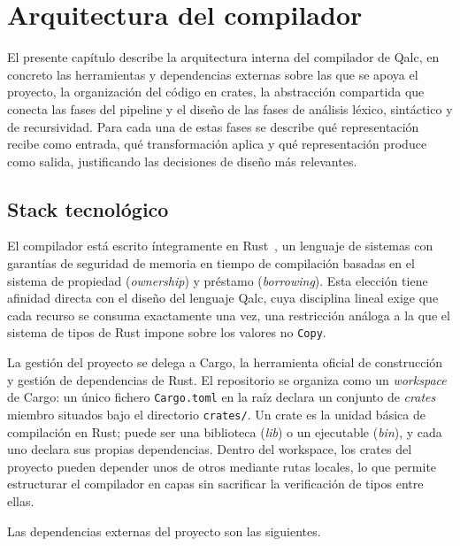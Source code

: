 \chapter{Arquitectura del compilador}
\label{ch:arquitectura}

El presente capítulo describe la arquitectura interna del compilador de Qalc, en concreto las herramientas y dependencias externas sobre las que se apoya el proyecto, la organización del código en crates, la abstracción compartida que conecta las fases del pipeline y el diseño de las fases de análisis léxico, sintáctico y de recursividad. Para cada una de estas fases se describe qué representación recibe como entrada, qué transformación aplica y qué representación produce como salida, justificando las decisiones de diseño más relevantes.

\section{Stack tecnológico}
\label{sec:stack}

El compilador está escrito íntegramente en Rust~\cite{matsakis_rust_2014}, un lenguaje de sistemas con garantías de seguridad de memoria en tiempo de compilación basadas en el sistema de propiedad (\textit{ownership}) y préstamo (\textit{borrowing}). Esta elección tiene afinidad directa con el diseño del lenguaje Qalc, cuya disciplina lineal exige que cada recurso se consuma exactamente una vez, una restricción análoga a la que el sistema de tipos de Rust impone sobre los valores no \lstinline|Copy|.

La gestión del proyecto se delega a Cargo, la herramienta oficial de construcción y gestión de dependencias de Rust. El repositorio se organiza como un \textit{workspace} de Cargo: un único fichero \lstinline|Cargo.toml| en la raíz declara un conjunto de \textit{crates} miembro situados bajo el directorio \lstinline|crates/|. Un crate es la unidad básica de compilación en Rust; puede ser una biblioteca (\textit{lib}) o un ejecutable (\textit{bin}), y cada uno declara sus propias dependencias. Dentro del workspace, los crates del proyecto pueden depender unos de otros mediante rutas locales, lo que permite estructurar el compilador en capas sin sacrificar la verificación de tipos entre ellas.

Las dependencias externas del proyecto son las siguientes.

